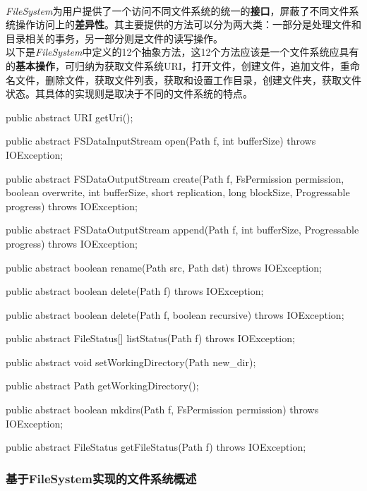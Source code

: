     \\
    \textit{FileSystem}为用户提供了一个访问不同文件系统的统一的\textbf{接口}，屏蔽了不同文件系统操作访问上的\textbf{差异性}。其主要提供的方法可以分为两大类：一部分是处理文件和目录相关的事务，另一部分则是文件的读写操作。\\
    以下是\textit{FileSystem}中定义的12个抽象方法，这12个方法应该是一个文件系统应具有的\textbf{基本操作}，可归纳为获取文件系统URI，打开文件，创建文件，追加文件，重命名文件，删除文件，获取文件列表，获取和设置工作目录，创建文件夹，获取文件状态。其具体的实现则是取决于不同的文件系统的特点。
    \begin{java}[caption=FileSystem abstract method]
public abstract URI getUri();

public abstract FSDataInputStream open(Path f, int bufferSize) throws IOException;

public abstract FSDataOutputStream create(Path f,
    FsPermission permission,
    boolean overwrite,
    int bufferSize,
    short replication,
    long blockSize,
    Progressable progress) throws IOException;

public abstract FSDataOutputStream append(Path f, int bufferSize, Progressable progress) throws IOException;

public abstract boolean rename(Path src, Path dst) throws IOException;

public abstract boolean delete(Path f) throws IOException;

public abstract boolean delete(Path f, boolean recursive) throws IOException;

public abstract FileStatus[] listStatus(Path f) throws IOException;

public abstract void setWorkingDirectory(Path new_dir);

public abstract Path getWorkingDirectory();

public abstract boolean mkdirs(Path f, FsPermission permission) throws IOException;

public abstract FileStatus getFileStatus(Path f) throws IOException;

    \end{java}

\subsubsection{基于FileSystem实现的文件系统概述}
